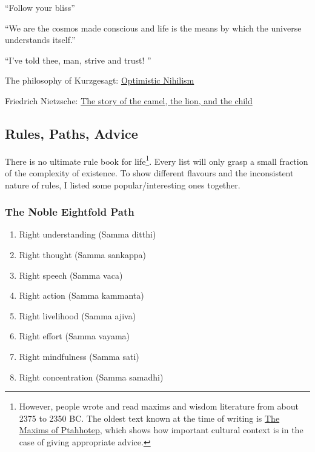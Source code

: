 \documentclass{article}
\begin{document}
\vspace{1cm}
{``Follow your bliss''
\\[5pt]
}

\vspace{1cm}
{``We are the cosmos made conscious and life is the means by which the universe understands itself.''
\\[5pt]
}

\vspace{1cm}
{``I've told thee, man, strive and trust! ''
\\[5pt]
}

The philosophy of Kurzgesagt: \href{https://www.youtube.com/watch?v=MBRqu0YOH14}{Optimistic Nihilism}

Friedrich Nietzsche:
\href{https://web.archive.org/web/20201105030858/https://medium.com/the-sophist/nietzsches-three-steps-to-a-meaningful-life-f063793adfc4}{The story of the camel, the lion, and the child}

\subsection{Rules, Paths, Advice}

There is no ultimate rule book for life\footnote{However, people wrote and read maxims and wisdom literature from about 2375 to 2350 BC. The oldest text known at the time of writing is \href{https://en.wikipedia.org/wiki/The_Maxims_of_Ptahhotep}{The Maxims of Ptahhotep}, which shows how important cultural context is in the case of giving appropriate advice.}. Every list will only grasp a small fraction of the complexity of existence. To show different flavours and the inconsistent nature of rules, I listed some popular/interesting ones together.



\subsubsection{The Noble Eightfold Path}

\begin{enumerate}
    \item Right understanding (Samma ditthi)
    \item Right thought (Samma sankappa)
    \item Right speech (Samma vaca) 
    \item Right action (Samma kammanta)
    \item Right livelihood (Samma ajiva) 
    \item Right effort (Samma vayama)
    \item Right mindfulness (Samma sati)
    \item Right concentration (Samma samadhi)
\end{enumerate}
\end{document}
